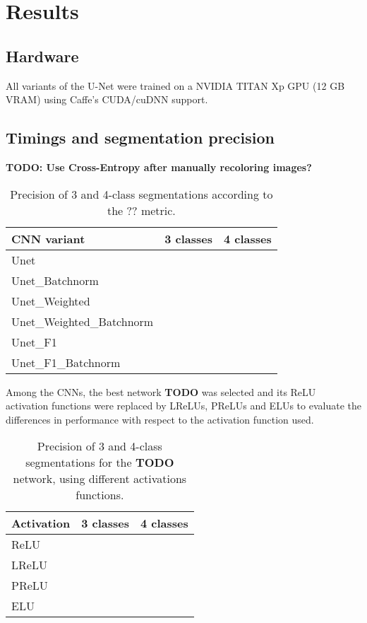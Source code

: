 \chapter {Results}
\label{chap:results}

	\section{Hardware}
All variants of the U-Net were trained on a NVIDIA TITAN Xp GPU (12 GB VRAM) using Caffe's CUDA/cuDNN support.

	\section {Timings and segmentation precision}
\textbf{TODO: Use Cross-Entropy after manually recoloring images?}

\begin {table}
	\centering
	\begin {tabular}[!ht]{|l|c|c|}
		\hline
		\textbf{CNN variant}& \textbf{3 classes}& \textbf{4 classes}\\ \hline
		Unet& & \\ \hline
		Unet\_Batchnorm& & \\ \hline
		Unet\_Weighted& & \\ \hline
		Unet\_Weighted\_Batchnorm& & \\ \hline
		Unet\_F1& & \\ \hline
		Unet\_F1\_Batchnorm & & \\ \hline
	\end {tabular}
\caption[]{Precision of 3 and 4-class segmentations according to the ?? metric.}
\end {table}

\noindent Among the CNNs, the best network \textbf{TODO} was selected and its ReLU activation functions were replaced by LReLUs, PReLUs and ELUs to evaluate the differences in performance with respect to the activation function used.

\begin {table}
	\centering
	\begin {tabular}[!ht]{|l|c|c|}
		\hline
		\textbf{Activation}& \textbf{3 classes}& \textbf{4 classes}\\ \hline
		ReLU& & \\ \hline
		LReLU& & \\ \hline
		PReLU& & \\ \hline
		ELU& & \\ \hline
	\end {tabular}
\caption[]{Precision of 3 and 4-class segmentations for the \textbf{TODO} network, using different activations functions.}
\end {table}

